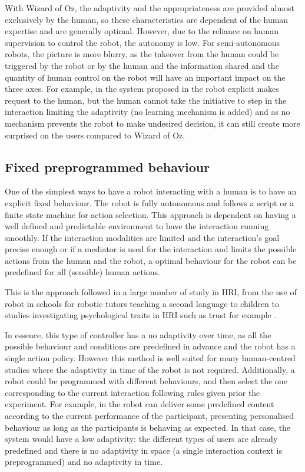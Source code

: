     With Wizard of Oz, the adaptivity and the appropriateness are provided
    almost exclusively by the human, so these characteristics are dependent of
    the human expertise and are generally optimal. However, due to the reliance
    on human supervision to control the robot, the autonomy is low. For
    semi-autonomous robots, the picture is more blurry, as the takeover from the
    human could be triggered by the robot or by the human and the information
    shared and the quantity of human control on the robot will have an important
    impact on the three axes. For example, in the system proposed in
    \citep{shiomi2008semi} the robot explicit makes request to the human, but
    the human cannot take the initiative to step in the interaction limiting the
    adaptivity (no learning mechanism is added) and as no mechanism prevents the
    robot to make undesired decision, it can still create more surprised on the
    users compared to Wizard of Oz.
	
\subsection{Fixed preprogrammed behaviour}

    One of the simplest ways to have a robot interacting with a human is to have
    an explicit fixed behaviour. The robot is fully autonomous and follows a
    script or a finite state machine for action selection. This approach is
    dependent on having a well defined and predictable environment to have the
    interaction running smoothly. If the interaction modalities are limited and
    the interaction's goal precise enough or if a mediator is used for the
    interaction and limits the possible actions from the human and the robot, a
    optimal behaviour for the robot can be predefined for all (sensible) human
    actions.

    This is the approach followed in a large number of study in HRI, from the
    use of robot in schools for robotic tutors teaching a second language to
    children \citep{kennedy2016social} to studies investigating psychological
    traits in HRI such as trust for example \citep{kahn2015will}.

    In essence, this type of controller has a no adaptivity over time, as all
    the possible behaviour and conditions are predefined in advance and the
    robot has a single action policy. However this method is well suited for
    many human-centred studies where the adaptivity in time of the robot is not
    required. Additionally, a robot could be programmed with different
    behaviours, and then select the one corresponding to the current interaction
    following rules given prior the experiment. For example, in
    \citet{leyzberg2014personalizing} the robot can deliver some predefined
    content according to the current performance of the participant, presenting
    personalised behaviour as long as the participants is behaving as expected.
    In that case, the system would have a low adaptivity: the different types of
    users are already predefined and there is no adaptivity in space (a single
    interaction context is preprogrammed) and no adaptivity in time.

